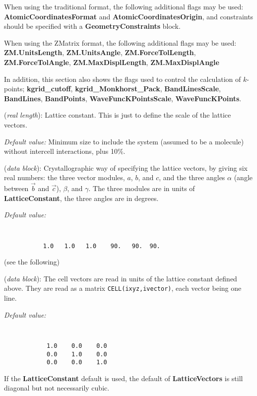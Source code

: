 \documentclass[11pt]{article}
\begin{document}
When using the traditional format, the following additional
flags may be used: \textbf{AtomicCoordinatesFormat} and
\textbf{AtomicCoordinatesOrigin}, and constraints should
be specified with a \textbf{GeometryConstraints} block.

When using the ZMatrix format, the following additional flags
may be used: \textbf{ZM.UnitsLength}, \textbf{ZM.UnitsAngle},
\textbf{ZM.ForceTolLength}, \textbf{ZM.ForceTolAngle}, 
\textbf{ZM.MaxDisplLength}, \textbf{ZM.MaxDisplAngle}

In addition, this section also shows the flags used to control
the calculation of $k$-points; \textbf{kgrid\_cutoff},
\textbf{kgrid\_Monkhorst\_Pack}, \textbf{BandLinesScale},
\textbf{BandLines}, \textbf{BandPoints},
\textbf{WaveFuncKPointsScale}, \textbf{WaveFuncKPoints}.


\begin{description}
\itemsep 10pt
\parsep 0pt


\item[{\bf LatticeConstant}] ({\it real length}): 
Lattice constant. This is just to define the scale of the lattice vectors.

{\it Default value:} Minimum size to include the system (assumed to be a 
molecule) without intercell interactions, plus 10\%. 

\item[{\bf LatticeParameters}] ({\it data block}): 
Crystallographic way of specifying the lattice vectors, by giving
six real numbers: the three vector modules, $a$, $b$, and $c$, and
the three angles $\alpha$ (angle between $\vec b$ and $\vec c$),
$\beta$, and $\gamma$. The three modules are in units of 
{\bf LatticeConstant}, the three angles are in degrees.

{\it Default value:}
{\tt
\begin{verbatim}
           1.0   1.0   1.0    90.   90.  90.
\end{verbatim}
}
\noindent
(see the following)

\item[{\bf LatticeVectors}] ({\it data block}): 
The cell vectors are read in units of the lattice constant defined above. 
They are read as a matrix {\tt CELL(ixyz,ivector)}, each vector being
one line.

{\it Default value:} 
{\tt 
\begin{verbatim}
            1.0    0.0    0.0 
            0.0    1.0    0.0 
            0.0    0.0    1.0 
\end{verbatim}
}
\noindent
If the {\bf LatticeConstant} default is used, the default of 
{\bf LatticeVectors} is still diagonal but not necessarily cubic.


\end{description}
\end{document}
